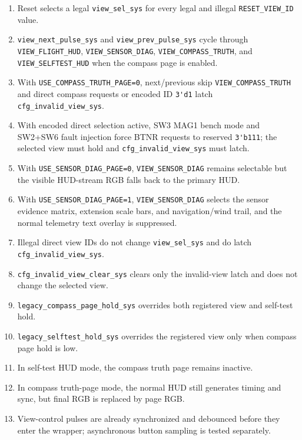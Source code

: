 \documentclass{article}
\newcommand{\sig}[1]{\begingroup\nolinkurl{#1}\endgroup}
\newcommand{\param}[1]{\begingroup\nolinkurl{#1}\endgroup}
\begin{document}
\begin{enumerate}
  \item Reset selects a legal \sig{view_sel_sys} for every legal and illegal
        \param{RESET_VIEW_ID} value.
  \item \sig{view_next_pulse_sys} and \sig{view_prev_pulse_sys} cycle through
        \sig{VIEW_FLIGHT_HUD}, \sig{VIEW_SENSOR_DIAG},
        \sig{VIEW_COMPASS_TRUTH}, and \sig{VIEW_SELFTEST_HUD} when the compass
        page is enabled.
  \item With \param{USE_COMPASS_TRUTH_PAGE=0}, next/previous skip
        \sig{VIEW_COMPASS_TRUTH} and direct compass requests or encoded ID
        \sig{3'd1} latch \sig{cfg_invalid_view_sys}.
  \item With encoded direct selection active, SW3 MAG1 bench mode and SW2+SW6
        fault injection force BTNR requests to reserved \sig{3'b111}; the
        selected view must hold and \sig{cfg_invalid_view_sys} must latch.
  \item With \param{USE_SENSOR_DIAG_PAGE=0}, \sig{VIEW_SENSOR_DIAG} remains
        selectable but the visible HUD-stream RGB falls back to the primary HUD.
  \item With \param{USE_SENSOR_DIAG_PAGE=1}, \sig{VIEW_SENSOR_DIAG} selects the
        sensor evidence matrix, extension scale bars, and navigation/wind trail,
        and the normal telemetry text overlay is suppressed.
  \item Illegal direct view IDs do not change \sig{view_sel_sys} and do latch
        \sig{cfg_invalid_view_sys}.
  \item \sig{cfg_invalid_view_clear_sys} clears only the invalid-view latch and
        does not change the selected view.
  \item \sig{legacy_compass_page_hold_sys} overrides both registered view and
        self-test hold.
  \item \sig{legacy_selftest_hold_sys} overrides the registered view only when
        compass page hold is low.
  \item In self-test HUD mode, the compass truth page remains inactive.
  \item In compass truth-page mode, the normal HUD still generates timing and
        sync, but final RGB is replaced by page RGB.
  \item View-control pulses are already synchronized and debounced before they
        enter the wrapper; asynchronous button sampling is tested separately.
\end{enumerate}
\end{document}
